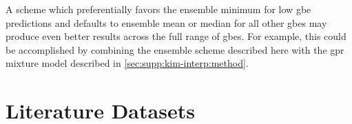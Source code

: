 \documentclass[preprint,12pt]{elsarticle}
\begin{document}
A scheme which preferentially favors the ensemble minimum for low \gls{gbe} predictions and defaults to ensemble mean or median for all other \glspl{gbe} may produce even better results across the full range of \glspl{gbe}. For example, this could be accomplished by combining the ensemble scheme described here with the \gls{gpr} mixture model described in \cref{sec:supp:kim-interp:method}.
%
%


%

\section{Literature Datasets}
\end{document}
